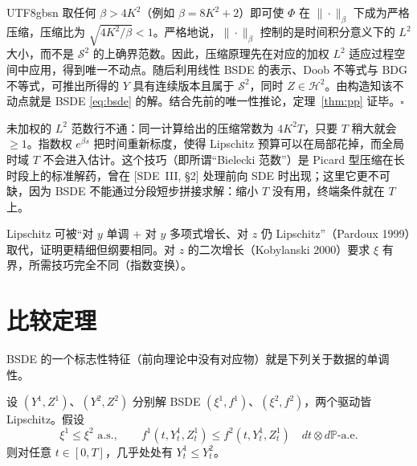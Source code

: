 \documentclass{article}
\theoremstyle{plain}
\theoremstyle{definition}
\theoremstyle{remark}
\newcommand{\Prob}{\mathbb{P}}
\newcommand{\Sc}{\mathcal{S}}
\newcommand{\Hc}{\mathcal{H}}
\begin{document}
\begin{CJK*}{UTF8}{gbsn}
\noindent 取任何 $\beta > 4K^2$（例如 $\beta = 8 K^2 + 2$）即可使 $\Phi$ 在 $\|\cdot\|_\beta$ 下成为严格压缩，压缩比为 $\sqrt{4K^2/\beta} < 1$。严格地说，$\|\cdot\|_\beta$ 控制的是时间积分意义下的 $L^2$ 大小，而不是 $\Sc^2$ 的上确界范数。因此，压缩原理先在对应的加权 $L^2$ 适应过程空间中应用，得到唯一不动点。随后利用线性 BSDE 的表示、Doob 不等式与 BDG 不等式，可推出所得的 $Y$ 具有连续版本且属于 $\Sc^2$，同时 $Z \in \Hc^2$。由构造知该不动点就是 BSDE \eqref{eq:bsde} 的解。结合先前的唯一性推论，定理~\ref{thm:pp} 证毕。$\square$

\begin{remark}[为何用加权范数？]
未加权的 $L^2$ 范数行不通：同一计算给出的压缩常数为 $4 K^2 T$，只要 $T$ 稍大就会 $\ge 1$。指数权 $e^{\beta s}$ 把时间重新标度，使得 Lipschitz 预算可以在局部花掉，而全局时域 $T$ 不会进入估计。这个技巧（即所谓“Bielecki 范数”）是 Picard 型压缩在长时段上的标准解药，曾在 [SDE~III, \S2] 处理前向 SDE 时出现；这里它更不可缺，因为 BSDE 不能通过分段短步拼接求解：缩小 $T$ 没有用，终端条件就在 $T$ 上。
\end{remark}

\begin{remark}[若 $f$ 对 $y$ 仅单调？]
Lipschitz 可被“对 $y$ 单调 + 对 $y$ 多项式增长、对 $z$ 仍 Lipschitz”（Pardoux 1999）取代，证明更精细但纲要相同。对 $z$ 的二次增长（Kobylanski 2000）要求 $\xi$ 有界，所需技巧完全不同（指数变换）。
\end{remark}

\section{比较定理}

BSDE 的一个标志性特征（前向理论中没有对应物）就是下列关于数据的单调性。

\begin{theorem}[比较定理]\label{thm:comparison}
设 $(Y^1, Z^1)$、$(Y^2, Z^2)$ 分别解 BSDE $(\xi^1, f^1)$、$(\xi^2, f^2)$，两个驱动皆 Lipschitz。假设
\[
  \xi^1 \le \xi^2 \text{ a.s.}, \qquad f^1(t, Y^1_t, Z^1_t) \le f^2(t, Y^1_t, Z^1_t) \quad dt \otimes d\Prob\text{-a.e.}
\]
则对任意 $t \in [0, T]$，几乎处处有 $Y^1_t \le Y^2_t$。
\end{theorem}


\end{CJK*}
\end{document}

